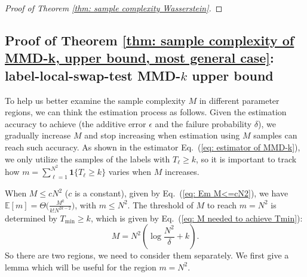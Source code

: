 \documentclass[aps,prx,reprint,superscriptaddress,amsmath,amssymb,longbibliography,floatfix]{revtex4-2}
\newcommand{\Abs}[1]{\left\lvert #1\right\rvert}
\newcommand{\dsE}{\mathbb{E}}
\newcommand{\scE}{\mathcal{E}}
\newcommand{\scO}{\mathcal{O}}
\theoremstyle{plain}
\theoremstyle{definition}
\theoremstyle{remark}
\begin{document}
\begin{proof}[Proof of Theorem \ref{thm: sample complexity Wasserstein}]

\end{proof}




\subsection{Proof of Theorem \ref{thm: sample complexity of MMD-k, upper bound, most general case}: label-local-swap-test MMD-$k$ upper bound }\label{appsub: MMD-k upper bound}

To help us better examine the sample complexity $M$ in different parameter regions, we can think the estimation process as follows. Given the estimation accuracy to achieve (the additive error $\epsilon$ and the failure probability $\delta$), we gradually increase $M$ and stop increasing when estimation using $M$ samples can reach such accuracy. As shown in the estimator Eq.~(\ref{eq: estimator of MMD-k}), we only utilize the samples of the labels with $T_\ell\ge k$, so it is important to track how $m=\sum_{\ell=1}^{N^2} \mathbf{1}\{T_{\ell} \ge k\}$ varies when $M$ increases.

When $M\le cN^2$ ($c$ is a constant), given by Eq.~(\ref{eq: Em M<=cN2}), we have $\dsE[m] = \Theta\Big(\frac{M^k}{k!N^{2k-2}}\Big)$, with $m\le N^2$. The threshold of $M$ to reach $m=N^2$ is determined by $T_{\min}\ge k$, which is given by Eq.~(\ref{eq: M needed to achieve Tmin}):
\begin{equation}
    M=N^2(\log \frac{N^2}{\delta}+k).\label{eq: M to reach Tmin=k}
\end{equation}
So there are two regions, we need to consider them separately. We first give a lemma which will be useful for the region $m=N^2$.
\end{document}
